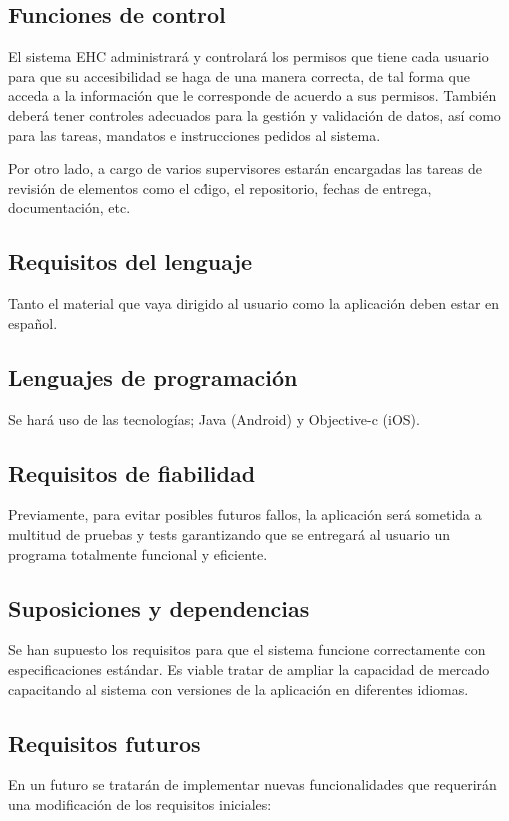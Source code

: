     \subsection{Funciones de control}
        El sistema EHC administrará y controlará los permisos que tiene cada usuario para que su accesibilidad se haga de una manera correcta, de tal forma que acceda a la información que le corresponde de acuerdo a sus permisos. También deberá tener controles adecuados para la gestión y validación de datos, así como para las tareas, mandatos e instrucciones pedidos al sistema.

        Por otro lado, a cargo de varios supervisores estarán encargadas las tareas de revisión de elementos como el c\'digo, el repositorio, fechas de entrega, documentación, etc.

    \subsection{Requisitos del lenguaje}
        Tanto el material que vaya dirigido al usuario como la aplicación deben estar en espa\~nol.

    \subsection{Lenguajes de programación}
        Se hará uso de las tecnologías; Java (Android) y Objective-c (iOS).

    \subsection{Requisitos de fiabilidad}
        Previamente, para evitar posibles futuros fallos, la aplicación será sometida a multitud de pruebas y tests garantizando que se entregará al usuario un programa totalmente funcional y eficiente.

    \subsection{Suposiciones y dependencias}
        Se han supuesto los requisitos para que el sistema funcione correctamente con especificaciones estándar.
        Es viable tratar de ampliar la capacidad de mercado capacitando al sistema con versiones de la aplicación en diferentes idiomas.

    \subsection{Requisitos futuros}
        En un futuro se tratarán de implementar nuevas funcionalidades que requerirán una modificación de los requisitos iniciales:

